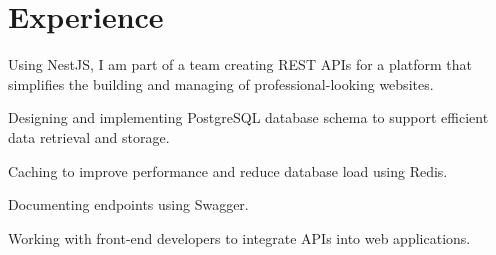 \documentclass[letterpaper]{deedy-resume} %
\begin{document}
\begin{minipage}[t]{0.66\textwidth} %


\section{Experience}


\vspace{\topsep} %

\sectionspace %



\vspace{\topsep} %
\begin{tightitemize}
\item Using NestJS, I am part of a team creating REST APIs for a platform that simplifies the building and managing of professional-looking websites.
\item Designing and implementing PostgreSQL database schema to support efficient data retrieval and storage.
\item Caching to improve performance and reduce database load using Redis.
\item Documenting endpoints using Swagger.
\item Working with front-end developers to integrate APIs into web applications.
\end{tightitemize}


\end{minipage}
\end{document}
